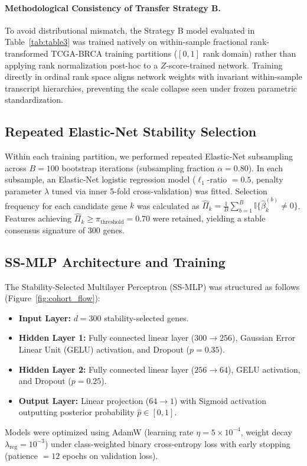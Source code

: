 \documentclass[11pt,a4paper]{article}
\begin{document}
\paragraph{Methodological Consistency of Transfer Strategy B.}
To avoid distributional mismatch, the Strategy B model evaluated in Table~\ref{tab:table3} was trained natively on within-sample fractional rank-transformed TCGA-BRCA training partitions ($[0, 1]$ rank domain) rather than applying rank normalization post-hoc to a $Z$-score-trained network. Training directly in ordinal rank space aligns network weights with invariant within-sample transcript hierarchies, preventing the scale collapse seen under frozen parametric standardization.

\subsection{Repeated Elastic-Net Stability Selection}
Within each training partition, we performed repeated Elastic-Net subsampling across $B = 100$ bootstrap iterations (subsampling fraction $\alpha = 0.80$). In each subsample, an Elastic-Net logistic regression model ($\ell_1$-ratio $= 0.5$, penalty parameter $\lambda$ tuned via inner 5-fold cross-validation) was fitted. Selection frequency for each candidate gene $k$ was calculated as $\hat{\Pi}_k = \frac{1}{B}\sum_{b=1}^{B}\mathbb{I}\{\hat{\beta}_k^{(b)} \neq 0\}$. Features achieving $\hat{\Pi}_k \ge \pi_{\text{threshold}} = 0.70$ were retained, yielding a stable consensus signature of 300 genes.

\subsection{SS-MLP Architecture and Training}
The Stability-Selected Multilayer Perceptron (SS-MLP) was structured as follows (Figure~\ref{fig:cohort_flow}):
\begin{itemize}
    \item \textbf{Input Layer:} $d = 300$ stability-selected genes.
    \item \textbf{Hidden Layer 1:} Fully connected linear layer ($300 \to 256$), Gaussian Error Linear Unit (GELU) activation, and Dropout ($p = 0.35$).
    \item \textbf{Hidden Layer 2:} Fully connected linear layer ($256 \to 64$), GELU activation, and Dropout ($p = 0.25$).
    \item \textbf{Output Layer:} Linear projection ($64 \to 1$) with Sigmoid activation outputting posterior probability $\hat{p} \in [0, 1]$.
\end{itemize}
Models were optimized using AdamW (learning rate $\eta = 5 \times 10^{-4}$, weight decay $\lambda_{\text{reg}} = 10^{-3}$) under class-weighted binary cross-entropy loss with early stopping (patience $= 12$ epochs on validation loss).
\end{document}
